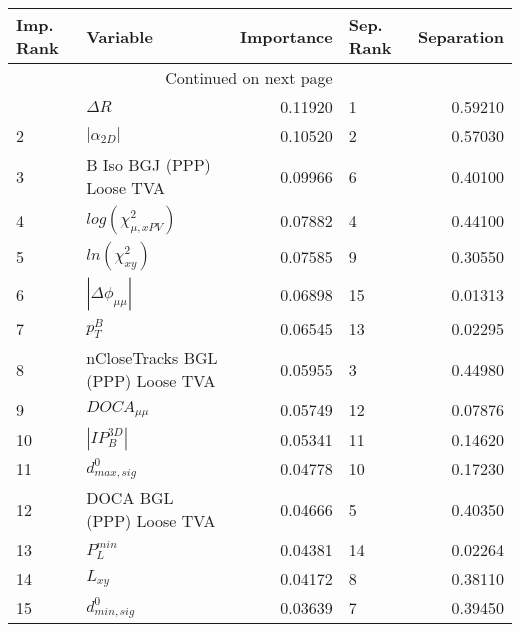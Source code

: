 \usepackage{lscape}

\begin{landscape}
\begin{longtable}{llrlr}
\toprule
Imp. Rank &                          Variable &  Importance & Sep. Rank &  Separation \\
\midrule
\endhead
\midrule
\multicolumn{3}{r}{{Continued on next page}} \\
\midrule
\endfoot

\bottomrule
\endlastfoot
        1 &                        $\Delta R$ &     0.11920 &         1 &     0.59210 \\
        2 &                   $|\alpha_{2D}|$ &     0.10520 &         2 &     0.57030 \\
        3 &         B Iso BGJ (PPP) Loose TVA &     0.09966 &         6 &     0.40100 \\
        4 &         $log(\chi^{2}_{\mu,xPV})$ &     0.07882 &         4 &     0.44100 \\
        5 &               $ln(\chi^{2}_{xy})$ &     0.07585 &         9 &     0.30550 \\
        6 &          $|\Delta \phi_{\mu\mu}|$ &     0.06898 &        15 &     0.01313 \\
        7 &                         $p^B_{T}$ &     0.06545 &        13 &     0.02295 \\
        8 &  nCloseTracks BGL (PPP) Loose TVA &     0.05955 &         3 &     0.44980 \\
        9 &                   $DOCA_{\mu\mu}$ &     0.05749 &        12 &     0.07876 \\
       10 &                   $|IP_{B}^{3D}|$ &     0.05341 &        11 &     0.14620 \\
       11 &                  $d^0_{max, sig}$ &     0.04778 &        10 &     0.17230 \\
       12 &          DOCA BGL (PPP) Loose TVA &     0.04666 &         5 &     0.40350 \\
       13 &                     $P^{min}_{L}$ &     0.04381 &        14 &     0.02264 \\
       14 &                          $L_{xy}$ &     0.04172 &         8 &     0.38110 \\
       15 &                  $d^0_{min, sig}$ &     0.03639 &         7 &     0.39450 \\
\end{longtable}

\end{landscape}
